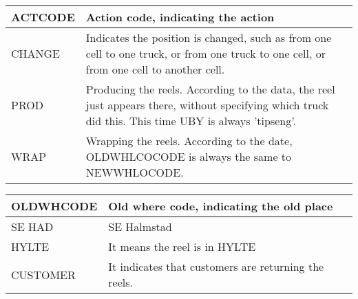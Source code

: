 \documentclass[a4paper]{report}
\begin{document}
\begin{table}[h]
\begin{tabular}{| l | p{ 12cm } |}
	\hline
	ACTCODE & Action code, indicating the action \\
	\hline
	CHANGE & Indicates the position is changed, such as from one cell to one truck, or from one truck to one cell, or from one cell to another cell.  
	\\
	\hline
	PROD & Producing the reels. According to the data, the reel just appears there, without specifying which truck did this. This time UBY is always 
	'tipseng'. \\
	\hline
	WRAP & Wrapping the reels. According to the date, OLDWHLCOCODE is always the same to NEWWHLOCODE. \\
	\hline
\end{tabular}
\end{table}	


\begin{table}[h]
\begin{tabular}{| l | p{12cm} |}
	\hline
	OLDWHCODE & Old where code, indicating the old place \\
	\hline
	SE HAD & SE Halmstad \\
	\hline
	HYLTE & It means the reel is in HYLTE \\
	\hline
	CUSTOMER & It indicates that customers are returning the reels. \\
	\hline
\end{tabular}
\end{table}	
\end{document}
